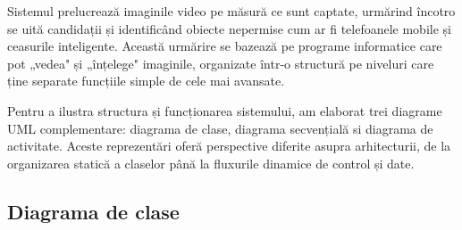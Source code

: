 \documentclass[12pt,a4paper]{article}
\begin{document}
Sistemul prelucrează imaginile video pe măsură ce sunt captate, urmărind încotro se uită candidații și identificând obiecte nepermise cum ar fi telefoanele mobile și ceasurile inteligente. Această urmărire se bazează pe programe informatice care pot „vedea" și „înțelege" imaginile, organizate într-o structură pe niveluri care ține separate funcțiile simple de cele mai avansate.

Pentru a ilustra structura și funcționarea sistemului, am elaborat trei diagrame UML complementare: diagrama de clase, diagrama secvențială si diagrama de activitate. Aceste reprezentări oferă perspective diferite asupra arhitecturii, de la organizarea statică a claselor până la fluxurile dinamice de control și date.

\subsection{Diagrama de clase}
\end{document}
